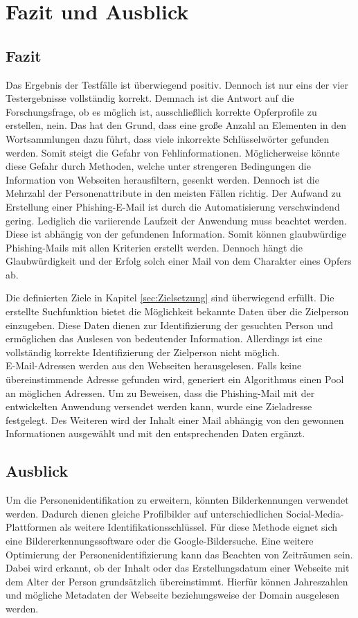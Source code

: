 \chapter{Fazit und Ausblick}
\label{chap:SchlussUndAusblick}
\section{Fazit}
Das Ergebnis der Testfälle ist überwiegend positiv. Dennoch ist nur eins der vier Testergebnisse vollständig korrekt. Demnach ist die Antwort auf die Forschungsfrage, ob es möglich ist, ausschließlich korrekte Opferprofile zu erstellen, nein. Das hat den Grund, dass eine große Anzahl an Elementen in den Wortsammlungen dazu führt, dass viele inkorrekte Schlüsselwörter gefunden werden. Somit steigt die Gefahr von Fehlinformationen. Möglicherweise könnte diese Gefahr durch Methoden, welche unter strengeren Bedingungen die Information von Webseiten herausfiltern, gesenkt werden. Dennoch ist die Mehrzahl der Personenattribute in den meisten Fällen richtig. Der Aufwand zu Erstellung einer Phishing-E-Mail ist durch die Automatisierung verschwindend gering. Lediglich die variierende Laufzeit der Anwendung muss beachtet werden. Diese ist abhängig von der gefundenen Information. Somit können glaubwürdige Phishing-Mails mit allen Kriterien erstellt werden. Dennoch hängt die Glaubwürdigkeit und der Erfolg solch einer Mail von dem Charakter eines Opfers ab.

Die definierten Ziele in Kapitel \ref{sec:Zielsetzung} sind überwiegend erfüllt. Die erstellte Suchfunktion bietet die Möglichkeit bekannte Daten über die Zielperson einzugeben. Diese Daten dienen zur Identifizierung der gesuchten Person und ermöglichen das Auslesen von bedeutender Information. Allerdings ist eine vollständig korrekte Identifizierung der Zielperson nicht möglich.\\ E-Mail-Adressen werden aus den Webseiten herausgelesen. Falls keine übereinstimmende Adresse gefunden wird, generiert ein Algorithmus einen Pool an möglichen Adressen. Um zu Beweisen, dass die Phishing-Mail mit der entwickelten Anwendung versendet werden kann, wurde eine Zieladresse festgelegt. Des Weiteren wird der Inhalt einer Mail abhängig von den gewonnen Informationen ausgewählt und mit den entsprechenden Daten ergänzt.

\section{Ausblick}
Um die Personenidentifikation zu erweitern, könnten Bilderkennungen verwendet werden. Dadurch dienen gleiche Profilbilder auf unterschiedlichen Social-Media-Plattformen als weitere Identifikationsschlüssel. Für diese Methode eignet sich eine Bildererkennungssoftware oder die Google-Bildersuche. Eine weitere Optimierung der Personenidentifizierung kann das Beachten von Zeiträumen sein. Dabei wird erkannt, ob der Inhalt oder das Erstellungsdatum einer Webseite mit dem Alter der Person grundsätzlich übereinstimmt. Hierfür können Jahreszahlen und mögliche Metadaten der Webseite beziehungsweise der Domain ausgelesen werden.

